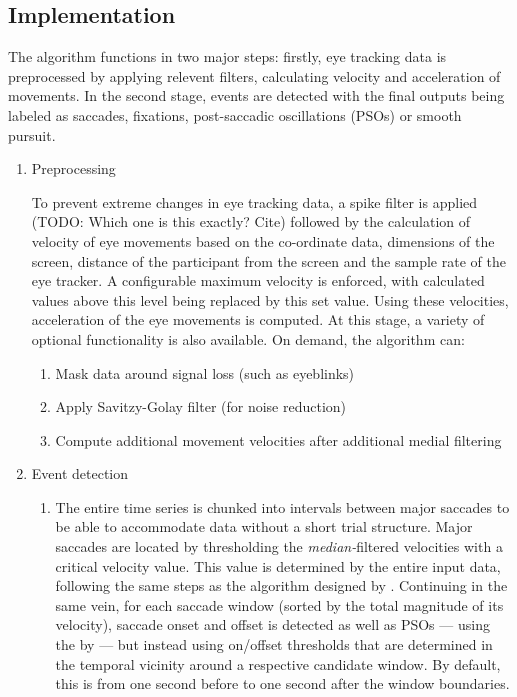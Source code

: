 \subsection*{Implementation}\label{impl}
 

The algorithm functions in two major steps: firstly, eye tracking data is preprocessed by applying relevent filters, calculating velocity and acceleration of movements. In the second stage, events are detected with the final outputs being labeled as saccades, fixations, post-saccadic oscillations (PSOs) or smooth pursuit.
\begin{enumerate}
\item{Preprocessing}

 To prevent extreme changes in eye tracking data, a spike filter is applied (TODO: Which one is this exactly? Cite) followed by the calculation of velocity of eye movements based on the co-ordinate data,  dimensions of the screen, distance of the participant from the screen and the sample rate of the eye tracker. A configurable maximum velocity is enforced, with calculated values above this level being replaced by this set value. Using these velocities, acceleration of the eye movements is computed. 
 At this stage, a variety of optional functionality is also available. On demand, the algorithm can: 
 \begin{enumerate}
 	\item Mask data around signal loss (such as eyeblinks)
 	\item Apply Savitzy-Golay filter (for noise reduction) 
 	\item Compute additional movement velocities after additional medial filtering
 	
 \end{enumerate}

\item{Event detection}
\begin{enumerate}

 \item The entire time series is chunked into intervals between major saccades to be able to accommodate data without a short trial structure. Major saccades are located by thresholding the \textit{median-}filtered velocities with a critical velocity value. This value is determined by the entire input data, following the same steps as the algorithm designed by \citet{Nystrom2010AnData}. Continuing in the same vein, for each saccade window (sorted by the total magnitude of its velocity), saccade onset and offset is detected as well as PSOs --- using the by \citet{Nystrom2010AnData} --- but instead using on/offset thresholds that are determined in the temporal vicinity around a respective candidate window. By default, this  is from one second before to one second after the window boundaries.
 

\end{enumerate}
\end{enumerate}
